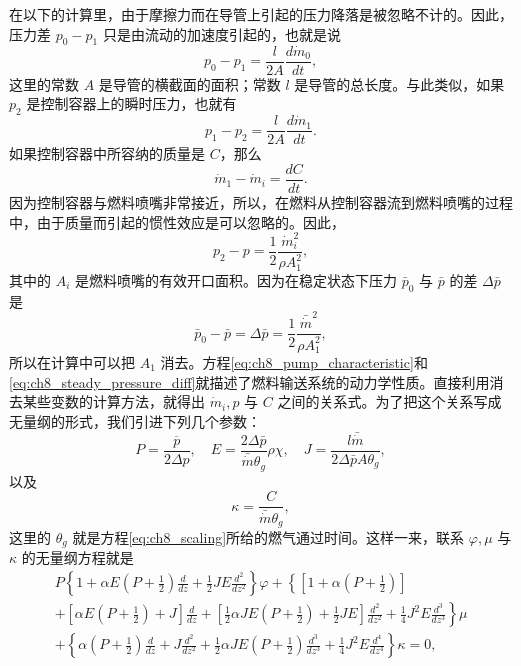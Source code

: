 在以下的计算里，由于摩擦力而在导管上引起的压力降落是被忽略不计的。因此，压力差 $ p_0 - p_1 $ 只是由流动的加速度引起的，也就是说
\begin{equation}\label{eq:ch8_pressure_drop_0_1}
p_0 - p_1 = \frac{l}{2A} \frac{d\dot{m}_0}{dt},
\end{equation}
这里的常数 $ A $ 是导管的横截面的面积；常数 $ l $ 是导管的总长度。与此类似，如果 $ p_2 $ 是控制容器上的瞬时压力，也就有
\begin{equation}\label{eq:ch8_pressure_drop_1_2}
p_1 - p_2 = \frac{l}{2A} \frac{d\dot{m}_1}{dt}.
\end{equation}
如果控制容器中所容纳的质量是 $ C $，那么
\begin{equation}\label{eq:ch8_control_container}
\dot{m}_1 - \dot{m}_i = \frac{dC}{dt}.
\end{equation}
因为控制容器与燃料喷嘴非常接近，所以，在燃料从控制容器流到燃料喷嘴的过程中，由于质量而引起的惯性效应是可以忽略的。因此，
\begin{equation}\label{eq:ch8_pressure_nozzle}
p_2 - p = \frac{1}{2} \frac{\dot{m}_i^2}{\rho A_1^2},
\end{equation}
其中的 $ A_i $ 是燃料喷嘴的有效开口面积。因为在稳定状态下压力 $ \bar{p}_0 $ 与 $ \bar{p} $ 的差 $ \Delta\bar{p} $ 是
\begin{equation}\label{eq:ch8_steady_pressure_diff}
\bar{p}_0 - \bar{p} = \Delta\bar{p} = \frac{1}{2} \frac{\bar{\dot{m}}^2}{\rho A_1^2},
\end{equation}
所以在计算中可以把 $ A_1 $ 消去。方程\eqref{eq:ch8_pump_characteristic}和\eqref{eq:ch8_steady_pressure_diff}就描述了燃料输送系统的动力学性质。直接利用消去某些变数的计算方法，就得出 $ \dot{m}_i, p $ 与 $ C $ 之间的关系式。为了把这个关系写成无量纲的形式，我们引进下列几个参数：
\begin{equation}\label{eq:ch8_dimensionless_params_1}
P = \frac{\overline{p}}{2\Delta p}, \quad E = \frac{2\Delta \bar{p}}{\bar{\dot{m}}\theta_g} \rho\chi, \quad J = \frac{l\bar{\dot{m}}}{2\Delta \bar{p}A\theta_g},
\end{equation}
以及
\begin{equation}\label{eq:ch8_dimensionless_kappa}
\kappa = \frac{C}{\bar{\dot{m}}\theta_g},
\end{equation}
这里的 $ \theta_g $ 就是方程\eqref{eq:ch8_scaling}所给的燃气通过时间。这样一来，联系 $ \varphi, \mu $ 与 $ \kappa $ 的无量纲方程就是
\begin{equation}\label{eq:ch8_dimensionless_system_eq}
\begin{array}{l}
P\left\{1 + \alpha E\left(P + \frac{1}{2}\right)\frac{d}{dz} + \frac{1}{2}JE\frac{d^2}{dz^2}\right\}\varphi + \left\{\left[1 + \alpha\left(P + \frac{1}{2}\right)\right] \right. \\
+ \left[\alpha E\left(P + \frac{1}{2}\right) + J\right]\frac{d}{dz} + \left[\frac{1}{2}\alpha JE\left(P + \frac{1}{2}\right) + \frac{1}{2}JE\right]\frac{d^2}{dz^2}+ \left. \frac{1}{4}J^2E\frac{d^3}{dz^3}\right\}\mu  \\
+ \left\{\alpha\left(P + \frac{1}{2}\right)\frac{d}{dz} + J\frac{d^2}{dz^2} + \frac{1}{2}\alpha JE\left(P + \frac{1}{2}\right)\frac{d^3}{dz^3} + \frac{1}{4}J^2E\frac{d^4}{dz^4}\right\}\kappa = 0,
\end{array}
\end{equation}
